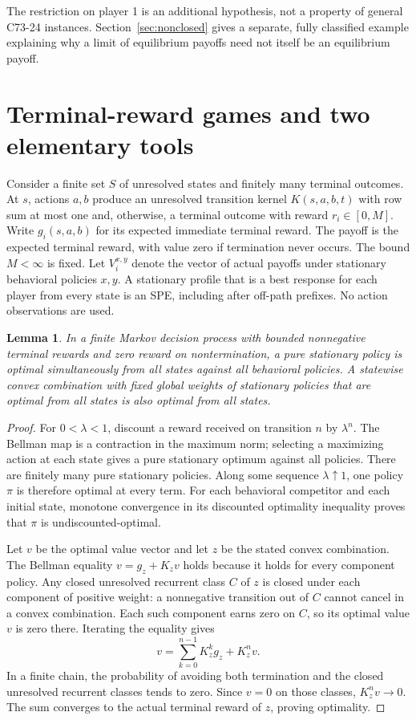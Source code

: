 \documentclass[11pt]{article}
\newtheorem{lemma}[theorem]{Lemma}
\begin{document}
The restriction on player 1 is an additional hypothesis, not a property
of general C73-24 instances. Section~\ref{sec:nonclosed} gives a separate,
fully classified example explaining why a limit of equilibrium payoffs
need not itself be an equilibrium payoff.

\section{Terminal-reward games and two elementary tools}
Consider a finite set $S$ of unresolved states and finitely many terminal
outcomes. At $s$, actions $a,b$ produce an unresolved transition kernel
$K(s,a,b,t)$ with row sum at most one and, otherwise, a terminal outcome
with reward $r_i\in[0,M]$. Write $g_i(s,a,b)$ for its expected immediate
terminal reward. The payoff is the expected terminal reward, with value
zero if termination never occurs. The bound $M<\infty$ is fixed.
Let $V_i^{x,y}$ denote the vector of actual payoffs under stationary
behavioral policies $x,y$. A stationary profile that is a best response
for each player from every state is an SPE, including after off-path
prefixes. No action observations are used.

\begin{lemma}\label{lem:mdp}
In a finite Markov decision process with bounded nonnegative terminal
rewards and zero reward on nontermination, a pure stationary policy is
optimal simultaneously from all states against all behavioral policies.
A statewise convex combination with fixed global weights of stationary
policies that are optimal from all states is also optimal from all states.
\end{lemma}
\begin{proof}
For $0<\lambda<1$, discount a reward received on transition $n$ by
$\lambda^n$. The Bellman map is a contraction in the maximum norm; selecting
a maximizing action at each state gives a pure stationary optimum against
all policies. There are finitely many pure stationary policies. Along
some sequence $\lambda\uparrow1$, one policy $\pi$ is therefore optimal
at every term. For each behavioral competitor and each initial state,
monotone convergence in its discounted optimality inequality proves that
$\pi$ is undiscounted-optimal.

Let $v$ be the optimal value vector and let $z$ be the stated convex
combination. The Bellman equality $v=g_z+K_zv$ holds because it holds
for every component policy. Any closed unresolved recurrent class $C$
of $z$ is closed under each component of positive weight: a nonnegative
transition out of $C$ cannot cancel in a convex combination. Each such
component earns zero on $C$, so its optimal value $v$ is zero there.
Iterating the equality gives
\[
 v=\sum_{k=0}^{n-1}K_z^k g_z+K_z^n v.
\]
In a finite chain, the probability of avoiding both termination and the
closed unresolved recurrent classes tends to zero. Since $v=0$ on those
classes, $K_z^n v\to0$. The sum converges to the actual terminal reward
of $z$, proving optimality.
\end{proof}
\end{document}
